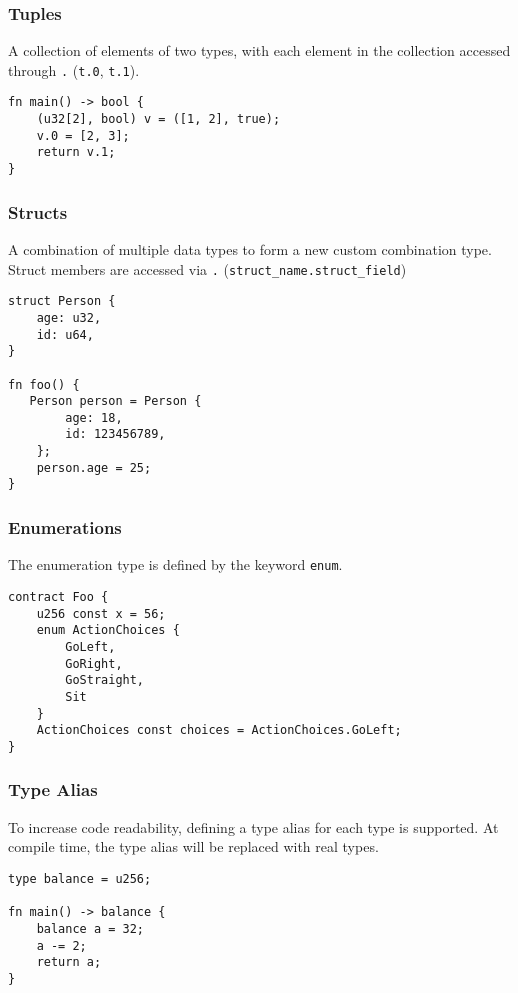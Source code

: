 \subsubsection*{Tuples}

A collection of elements of two types, with each element in the collection accessed through \texttt{.} (\texttt{t.0}, \texttt{t.1}).

\begin{lstlisting}
fn main() -> bool {
    (u32[2], bool) v = ([1, 2], true);
    v.0 = [2, 3];
    return v.1;
}
\end{lstlisting}

\subsubsection*{Structs}

A combination of multiple data types to form a new custom combination type. Struct members are accessed via \texttt{.} (\texttt{struct\_name.struct\_field})

\begin{lstlisting}
struct Person {
    age: u32,
    id: u64,
}

fn foo() {
   Person person = Person {
        age: 18,
        id: 123456789,
    };
    person.age = 25;
}
\end{lstlisting}

\subsubsection*{Enumerations}

The enumeration type is defined by the keyword \texttt{enum}.

\begin{lstlisting}
contract Foo {
    u256 const x = 56;
    enum ActionChoices {
        GoLeft,
        GoRight,
        GoStraight,
        Sit
    }
    ActionChoices const choices = ActionChoices.GoLeft;
}
\end{lstlisting}


\subsubsection*{Type Alias}

To increase code readability, defining a type alias for each type is supported. At compile time, the type alias will be replaced with real types.

\begin{lstlisting}
type balance = u256;

fn main() -> balance {
    balance a = 32;
    a -= 2;
    return a;
}
\end{lstlisting}

